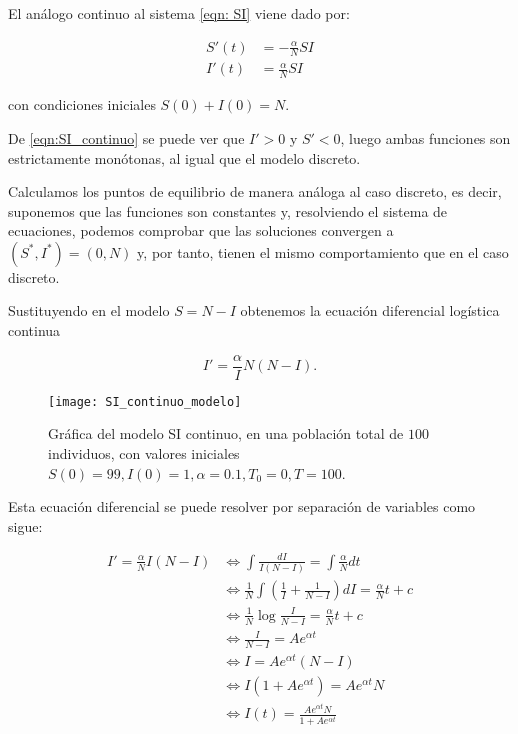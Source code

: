 El análogo continuo al sistema \eqref{eqn: SI} viene dado por:

\begin{equation}
\label{eqn:SI_continuo}
\begin{aligned}
S'(t) & = -\frac{\alpha}{N}SI \\
I'(t) & = \frac{\alpha}{N}SI
\end{aligned}
\end{equation}

con condiciones iniciales $S(0)+I(0)=N$.

De \eqref{eqn:SI_continuo} se puede ver que $I'>0$ y $S'<0$, luego ambas funciones son estrictamente monótonas, al igual que el modelo discreto.

Calculamos los puntos de equilibrio de manera análoga al caso discreto, es decir, suponemos que las funciones son constantes y, resolviendo el sistema de ecuaciones, podemos comprobar que las soluciones convergen a $(S^*,I^*)=(0,N)$ y, por tanto, tienen el mismo comportamiento que en el caso discreto.

Sustituyendo en el modelo $S=N-I$ obtenemos la ecuación diferencial logística continua

$$I' = \frac{\alpha}I{N}(N-I).$$

\begin{figure}
\begin{center}
\caption{Gráfica del modelo SI continuo, en una población total de $100$ individuos, con valores iniciales $S(0)=99, I(0) = 1, \alpha = 0.1,T_0 = 0, T = 100$.}
\label{fig: SI_continuo}
\texttt{[image: SI\_continuo\_modelo]}
\end{center}
\end{figure}

Esta ecuación diferencial se puede resolver por separación de variables como sigue:

\begin{equation}
\begin{aligned}
I'=\frac{\alpha}{N}I(N-I) & \Leftrightarrow \int \frac{dI}{I(N-I)} = \int \frac{\alpha}{N} dt \\
& \Leftrightarrow \frac{1}{N}\int \left(\frac{1}{I}+\frac{1}{N-I}\right) dI = \frac{\alpha}{N}t+c \\
& \Leftrightarrow  \frac{1}{N}\log{\frac{I}{N-I}} = \frac{\alpha}{N}t+c \\
& \Leftrightarrow  \frac{I}{N-I} = Ae^{\alpha t} \\
& \Leftrightarrow  I = Ae^{\alpha t}(N-I) \\
& \Leftrightarrow  I(1+Ae^{\alpha t}) = Ae^{\alpha t}N \\
& \Leftrightarrow  I(t) = \frac{Ae^{\alpha t}N}{1+Ae^{\alpha t} }
\end{aligned}
\end{equation}

